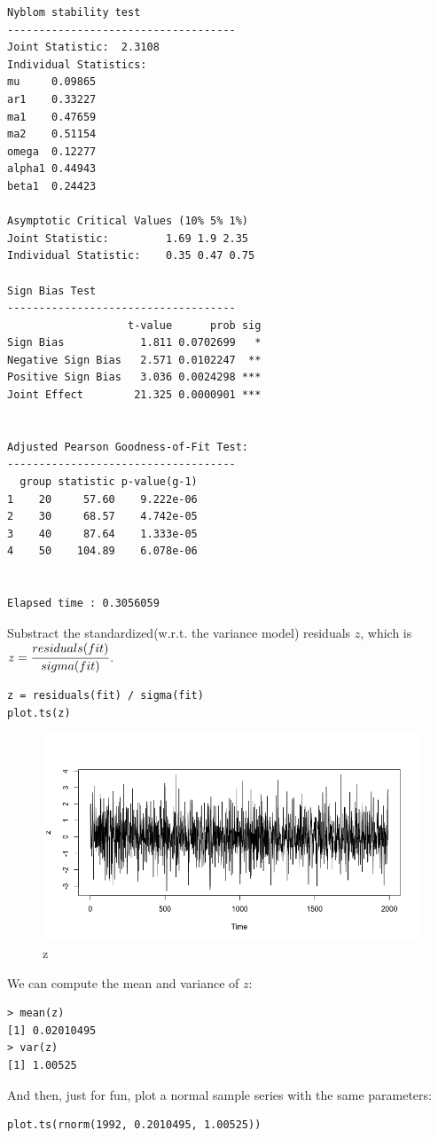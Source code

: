 \documentclass[a4paper, 11pt]{article}
\begin{document}
\begin{verbatim}
Nyblom stability test
------------------------------------
Joint Statistic:  2.3108
Individual Statistics:              
mu     0.09865
ar1    0.33227
ma1    0.47659
ma2    0.51154
omega  0.12277
alpha1 0.44943
beta1  0.24423

Asymptotic Critical Values (10% 5% 1%)
Joint Statistic:     	 1.69 1.9 2.35
Individual Statistic:	 0.35 0.47 0.75

Sign Bias Test
------------------------------------
                   t-value      prob sig
Sign Bias            1.811 0.0702699   *
Negative Sign Bias   2.571 0.0102247  **
Positive Sign Bias   3.036 0.0024298 ***
Joint Effect        21.325 0.0000901 ***


Adjusted Pearson Goodness-of-Fit Test:
------------------------------------
  group statistic p-value(g-1)
1    20     57.60    9.222e-06
2    30     68.57    4.742e-05
3    40     87.64    1.333e-05
4    50    104.89    6.078e-06


Elapsed time : 0.3056059
\end{verbatim}

\indent Substract the standardized(w.r.t. the variance model) residuals $z$, which is $z = \cfrac{residuals(fit)}{sigma(fit)}$.

\begin{verbatim}
z = residuals(fit) / sigma(fit)
plot.ts(z)
\end{verbatim}

\begin{figure}[H]
\centering
\caption{z}
\includegraphics[scale=.40]{z.png}
\end{figure}

\indent We can compute the mean and variance of $z$:
\begin{verbatim}
> mean(z)
[1] 0.02010495
> var(z)
[1] 1.00525
\end{verbatim} 
\indent And then, just for fun, plot a normal sample series with the same parameters:
\begin{verbatim}
plot.ts(rnorm(1992, 0.2010495, 1.00525))
\end{verbatim}
\end{document}
